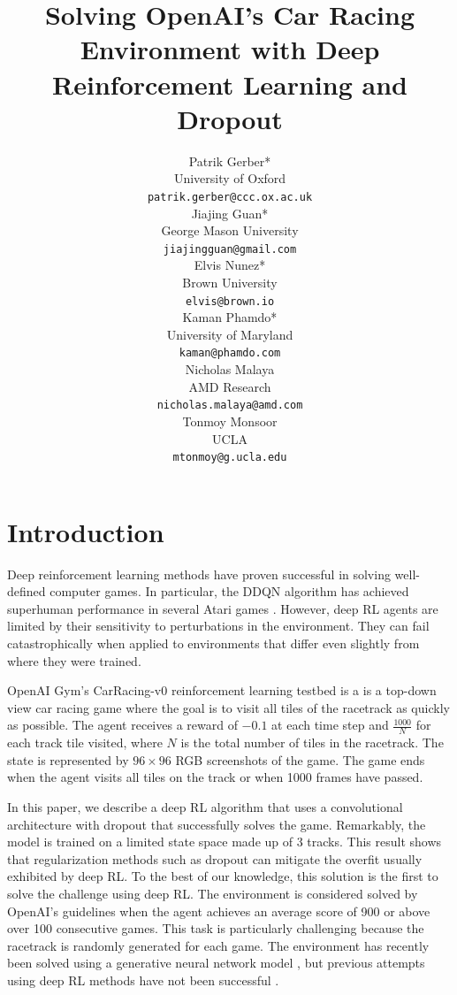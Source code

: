 \documentclass{article}
\title{Solving OpenAI's Car Racing Environment with Deep Reinforcement Learning and Dropout}
\author{
  Patrik Gerber* \\
  University of Oxford \\
  \texttt{patrik.gerber@ccc.ox.ac.uk} \\
  \And
  Jiajing Guan* \\
  George Mason University \\ 
  \texttt{jiajingguan@gmail.com} \\
  \And
  Elvis Nunez* \\
  Brown University \\
  \texttt{elvis@brown.io} \\
  \And
  Kaman Phamdo* \\
  University of Maryland \\
  \texttt{kaman@phamdo.com} \\
  \And
  Nicholas Malaya \\
  AMD Research \\ 
  \texttt{nicholas.malaya@amd.com} \\
  \And
  Tonmoy Monsoor \\
  UCLA \\
  \texttt{mtonmoy@g.ucla.edu} \\
}
\begin{document}

\maketitle


\section{Introduction}
Deep reinforcement learning methods have proven successful in solving well-defined computer games. In particular, the DDQN algorithm has achieved superhuman performance in several Atari games \cite{DQN}. However, deep RL agents are limited by their sensitivity to perturbations in the environment. They can fail catastrophically when applied to environments that differ even slightly from where they were trained.

OpenAI Gym’s CarRacing-v0 reinforcement learning testbed \cite{CarRacing} is a is a top-down view car racing game where the goal is to visit all tiles of the racetrack as quickly as possible. The agent receives a reward of $-0.1$ at each time step and $\frac{1000}{N}$ for each track tile visited, where $N$ is the total number of tiles in the racetrack. The state is represented by $96\times96$ RGB screenshots of the game. The game ends when the agent visits all tiles on the track or when 1000 frames have passed. 

In this paper, we describe a deep RL algorithm that uses a convolutional architecture with dropout that successfully solves the game. Remarkably, the model is trained on a limited state space made up of 3 tracks. This result shows that regularization methods such as dropout can mitigate the overfit usually exhibited by deep RL. To the best of our knowledge, this solution is the first to solve the challenge using deep RL. The environment is considered solved by OpenAI’s guidelines when the agent achieves an average score of 900 or above over 100 consecutive games. This task is particularly challenging because the racetrack is randomly generated for each game. The environment has recently been solved using a generative neural network model \cite{World_Models}, but previous attempts using deep RL methods have not been successful \cite{CarRacing1}. 
\end{document}
